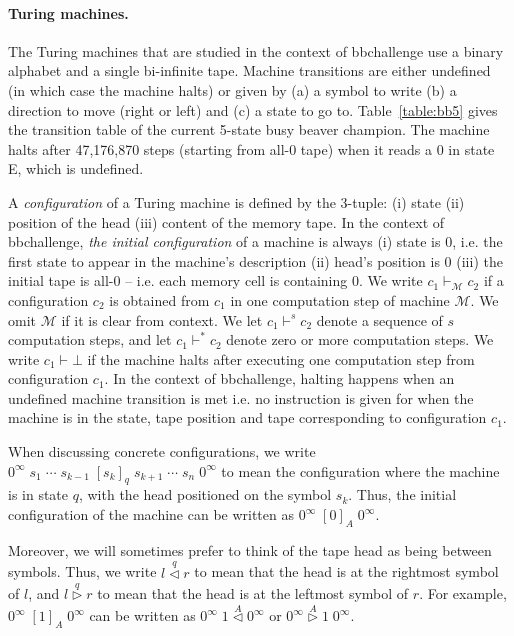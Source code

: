 \documentclass[a4paper,british]{article}
\theoremstyle{definition} %
\numberwithin{equation}{section}
\theoremstyle{remark} %
\newcommand{\lhead}[1]{\stackrel{#1}\triangleleft}
\newcommand{\rhead}[1]{\stackrel{#1}\triangleright}
\begin{document}
\paragraph*{Turing machines.}The Turing machines that are studied in the context of bbchallenge use a binary alphabet and a single bi-infinite tape. Machine transitions are either undefined (in which case the machine halts) or given by (a) a symbol to write (b) a direction to move (right or left) and (c) a state to go to. Table~\ref{table:bb5} gives the transition table of the current 5-state busy beaver champion. The machine halts after 47,176,870 steps (starting from all-0 tape) when it reads a 0 in state E, which is undefined.

A \textit{configuration} of a Turing machine is defined by the 3-tuple: (i) state (ii) position of the head (iii) content of the memory tape. In the context of bbchallenge, \textit{the initial configuration} of a machine is always (i) state is 0, i.e. the first state to appear in the machine's description (ii) head's position is 0 (iii) the initial tape is all-0 -- i.e. each memory cell is containing 0. We write $c_1 \vdash_\mathcal{M} c_2$ if a configuration $c_2$ is obtained from $c_1$ in one computation step of machine $\mathcal{M}$. We omit $\mathcal{M}$ if it is clear from context. We let $c_1 \vdash^s c_2$ denote a sequence of $s$ computation steps, and let  $c_1 \vdash^* c_2$ denote zero or more computation steps. %
We write $c_1 \vdash \bot$ if the machine halts after executing one computation step from configuration $c_1$. In the context of bbchallenge, halting happens when an undefined machine transition  is met i.e. no instruction is given for when the machine is in the state, tape position and tape corresponding to configuration $c_1$.

When discussing concrete configurations, we write
$0^\infty\; s_1\; \cdots\; s_{k-1}\; [s_k]_q\; s_{k+1}\; \cdots\; s_n\; 0^\infty$
to mean the configuration where the machine is in state $q$, with the head
positioned on the symbol $s_k$. Thus, the initial configuration of the machine
can be written as $0^\infty\; [0]_A\; 0^\infty$.

Moreover, we will sometimes prefer to think of the tape head as being between
symbols. Thus, we write $l \lhead{q} r$ to mean that the head is at the rightmost symbol
of $l$, and $l \rhead{q} r$ to mean that the head is at the leftmost symbol of $r$.
For example, $0^\infty\; [1]_A\; 0^\infty$ can be written as
$0^\infty\; 1 \lhead A 0^\infty$ or $0^\infty \rhead A 1\; 0^\infty$.
\end{document}
